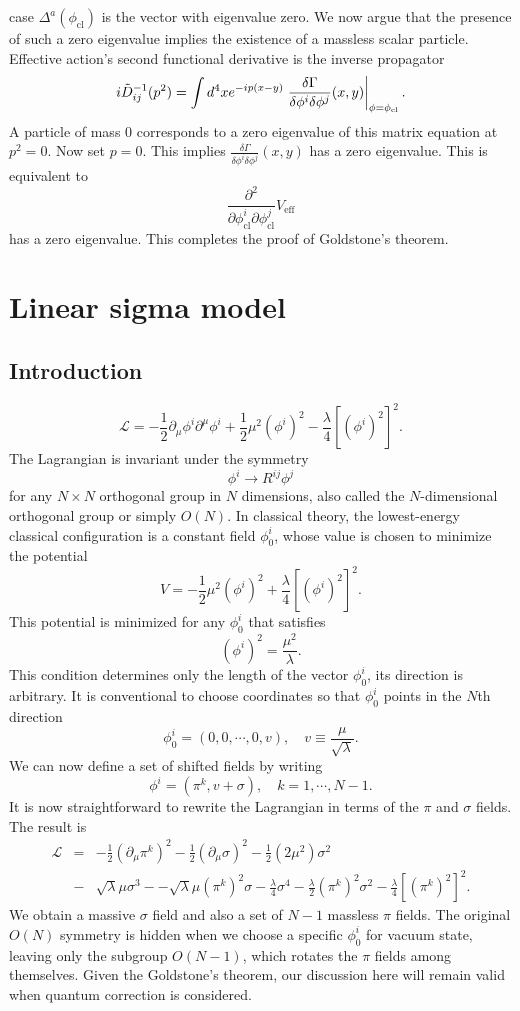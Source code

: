 \begin{newproof}
case $\Delta^a(\phi_{\mathrm{cl}})$ is the vector with eigenvalue zero.
We now argue that the presence of such a zero eigenvalue implies the existence of a massless scalar particle. Effective action's second functional derivative is the inverse propagator
\[i\tilde{D}_{ij}^{-1}(p^2) = \int d^4x e^{-ip(x-y)} \left. \frac{\delta \Gamma}{\delta \phi^i \delta \phi^j}(x,y) \right|_{\phi = \phi_{\rm cl}}.\]
A particle of mass $0$ corresponds to a zero eigenvalue of this matrix equation at $p^2 = 0$. Now set $p=0$. This implies $\frac{\delta \Gamma}{\delta \phi^i \delta \phi^j}(x,y)$ has a zero eigenvalue. This is equivalent to 
\[\frac{\partial^2}{\partial \phi^i_{\mathrm{cl}} \partial \phi^j_{\mathrm{cl}}}V_{\mathrm{eff}}\]
has a zero eigenvalue. This completes the proof of Goldstone's theorem.
\end{newproof}

\section{Linear sigma model}
\subsection{Introduction}
\[\mathcal{L} = -\frac{1}{2} \partial_{\mu} \phi^i \partial^{\mu}\phi^i + \frac{1}{2} \mu^2 (\phi^i)^2 - \frac{\lambda}{4} [(\phi^i)^2]^2.\]
The Lagrangian is invariant under the symmetry
\[\phi^i \to R^{ij} \phi^j\]
for any $N \times N$ orthogonal group in $N$ dimensions, also called the $N$-dimensional orthogonal group or simply $O(N)$. In classical theory, the lowest-energy classical configuration is a constant field $\phi_0^i$, whose value is chosen to minimize the potential
\[V = -\frac{1}{2}\mu^2 (\phi^i)^2 + \frac{\lambda}{4}[(\phi^i)^2]^2.\]
This potential is minimized for any $\phi_0^i$ that satisfies
\[(\phi^i)^2 = \frac{\mu^2}{\lambda} .\]
This condition determines only the length of the vector $\phi_0^i$, its direction is arbitrary. 
It is conventional to choose coordinates so that $\phi_0^i$ points in the $N$th direction
\[\phi_0^i = (0,0,\cdots,0,v) , \quad v \equiv \frac{\mu}{\sqrt{\lambda}}.\]
We can now define a set of shifted fields by writing
\[\phi^i = (\pi^k,v+\sigma) , \quad k = 1,\cdots,N-1.\]
It is now straightforward to rewrite the Lagrangian in terms of the $\pi$ and $\sigma$ fields. The result is
\begin{eqnarray}
\mathcal{L} &=& -\frac{1}{2}(\partial_{\mu}\pi^k)^2 - \frac{1}{2}(\partial_{\mu}\sigma)^2 - \frac{1}{2}(2\mu^2)\sigma^2 \nonumber \\
&-& \sqrt{\lambda}\mu \sigma^3 - -\sqrt{\lambda}\mu (\pi^k)^2\sigma - \frac{\lambda}{4}\sigma^4 - \frac{\lambda}{2}(\pi^k)^2\sigma^2 - \frac{\lambda}{4}[(\pi^k)^2]^2 .\nonumber
\end{eqnarray}
We obtain a massive $\sigma$ field and also a set of $N-1$ massless $\pi$ fields. The original $O(N)$ symmetry is hidden when we choose a specific $\phi_0^i$ for vacuum state, leaving only the subgroup $O(N-1)$, which rotates the $\pi$ fields among themselves. Given the Goldstone's theorem, our discussion here will remain valid when quantum correction is considered.

